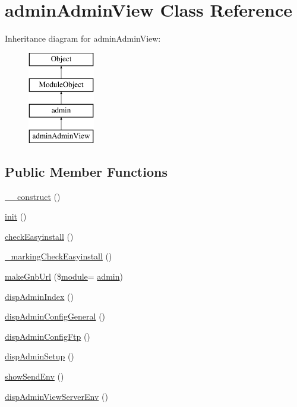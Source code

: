\hypertarget{classadminAdminView}{}\section{admin\+Admin\+View Class Reference}
\label{classadminAdminView}
Inheritance diagram for admin\+Admin\+View\+:\begin{figure}[H]
\begin{center}
\leavevmode
\includegraphics[height=4.000000cm]{classadminAdminView}
\end{center}
\end{figure}
\subsection*{Public Member Functions}
\begin{DoxyCompactItemize}
\item 
\hyperlink{classadminAdminView_a8bf927cf8a3c6554d083a29f90a8e3eb}{\+\_\+\+\_\+construct} ()
\item 
\hyperlink{classadminAdminView_a9211d29a895ebead46f78e6fc9eab285}{init} ()
\item 
\hyperlink{classadminAdminView_ae7b11554f7c30beb8554d15b33852dd7}{check\+Easyinstall} ()
\item 
\hyperlink{classadminAdminView_ad1fe5e140900ad8f5814871ed6ae9508}{\+\_\+marking\+Check\+Easyinstall} ()
\item 
\hyperlink{classadminAdminView_ade77034df3a5bc074b5a1f1cb4c47419}{make\+Gnb\+Url} (\$\hyperlink{classmodule}{module}= \textquotesingle{}\hyperlink{classadmin}{admin}\textquotesingle{})
\item 
\hyperlink{classadminAdminView_aff78cea8f2e5632395dd4888742389b8}{disp\+Admin\+Index} ()
\item 
\hyperlink{classadminAdminView_accaee16084bc6def9e841518d227be0e}{disp\+Admin\+Config\+General} ()
\item 
\hyperlink{classadminAdminView_ac1d596c739213d4fd3f127a6ca18c155}{disp\+Admin\+Config\+Ftp} ()
\item 
\hyperlink{classadminAdminView_acfa4a5d1209080974ca5fd15d04565e9}{disp\+Admin\+Setup} ()
\item 
\hyperlink{classadminAdminView_a4c4c900f637d618a7c8fbcbf523ad801}{show\+Send\+Env} ()
\item 
\hyperlink{classadminAdminView_a6b110bb8ccba975a670fdfbe559f7118}{disp\+Admin\+View\+Server\+Env} ()
\end{DoxyCompactItemize}
